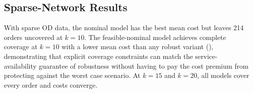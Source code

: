 \documentclass[11pt]{article}
\theoremstyle{definition}
\begin{document}
\subsection{Sparse-Network Results}

With sparse OD data, the nominal model has the best mean cost but leaves 214 orders uncovered at $k=10$. The feasible-nominal model achieves complete coverage at $k=10$ with a lower mean cost than any robust variant
(),
demonstrating that explicit coverage constraints can match the service-availability guarantee of robustness without having to pay the cost premium from protecting against the worst case scenario. At $k=15$ and $k=20$, all models cover every order and costs converge.

\begin{table}[h]
	\centering
	\caption{%
		Sparse-network results, full-OD May orders.
		Bold = best in column within each $k$-block.
		Mean costs for Nominal at $k=10$ exclude 214 uncovered orders.%
	}
	\label{tab:sparse-summary}
	\small
\end{table}
\end{document}
